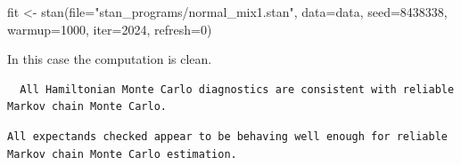 \documentclass[
  letterpaper,
  DIV=11,
  numbers=noendperiod]{scrartcl}
\newenvironment{Shaded}{\begin{snugshade}}{\end{snugshade}}
\newcommand{\AttributeTok}[1]{\textcolor[rgb]{0.40,0.45,0.13}{#1}}
\newcommand{\ConstantTok}[1]{\textcolor[rgb]{0.56,0.35,0.01}{#1}}
\newcommand{\DecValTok}[1]{\textcolor[rgb]{0.68,0.00,0.00}{#1}}
\newcommand{\FunctionTok}[1]{\textcolor[rgb]{0.28,0.35,0.67}{#1}}
\newcommand{\NormalTok}[1]{\textcolor[rgb]{0.00,0.23,0.31}{#1}}
\newcommand{\OtherTok}[1]{\textcolor[rgb]{0.00,0.23,0.31}{#1}}
\newcommand{\SpecialCharTok}[1]{\textcolor[rgb]{0.37,0.37,0.37}{#1}}
\newcommand{\StringTok}[1]{\textcolor[rgb]{0.13,0.47,0.30}{#1}}
\begin{document}
\begin{Shaded}
\begin{Highlighting}[]
\NormalTok{fit }\OtherTok{\textless{}{-}} \FunctionTok{stan}\NormalTok{(}\AttributeTok{file=}\StringTok{"stan\_programs/normal\_mix1.stan"}\NormalTok{,}
            \AttributeTok{data=}\NormalTok{data, }\AttributeTok{seed=}\DecValTok{8438338}\NormalTok{,}
            \AttributeTok{warmup=}\DecValTok{1000}\NormalTok{, }\AttributeTok{iter=}\DecValTok{2024}\NormalTok{, }\AttributeTok{refresh=}\DecValTok{0}\NormalTok{)}
\end{Highlighting}
\end{Shaded}

In this case the computation is clean.

\begin{Shaded}
\end{Shaded}

\begin{verbatim}
  All Hamiltonian Monte Carlo diagnostics are consistent with reliable
Markov chain Monte Carlo.
\end{verbatim}

\begin{Shaded}
\end{Shaded}

\begin{verbatim}
All expectands checked appear to be behaving well enough for reliable
Markov chain Monte Carlo estimation.
\end{verbatim}
\end{document}
